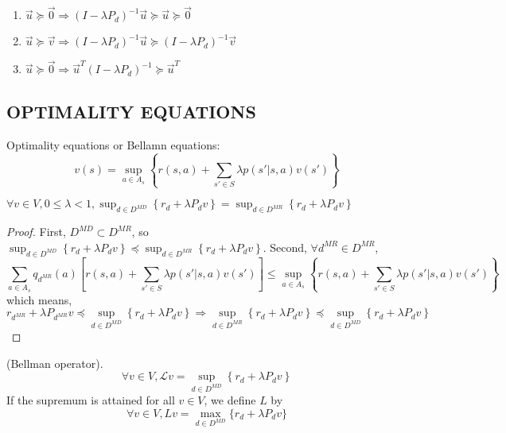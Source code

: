 \begin{lemma}
    \begin{enumerate}
        \item $ \vec u \succeq \vec 0 \Rightarrow {(I - \lambda P_d)}^{-1} \vec u \succeq \vec u \succeq \vec 0 $
        \item $ \vec u \succeq \vec v \Rightarrow {(I - \lambda P_d)}^{-1} \vec u \succeq {(I - \lambda P_d)}^{-1} \vec v $
        \item $ \vec u \succeq \vec 0 \Rightarrow \vec u^T {(I - \lambda P_d)}^{-1} \succeq \vec u^T $
    \end{enumerate}
\end{lemma}

\subsection{OPTIMALITY EQUATIONS}%
\label{sub:optimality_equations}

Optimality equations or Bellamn equations:
\[
    v(s) = \sup_{a \in A_s} \left\{ r(s, a) + \sum^{}_{s' \in S} \lambda p(s' | s, a) v(s') \right\}
\]

\begin{lemma}
    $ \forall v \in V, 0 \le \lambda < 1, \sup_{d \in D^{MD}} \left\{ r_d + \lambda P_d v \right\}
    = \sup_{d \in D^{MR}} \left\{ r_d + \lambda P_d v \right\}$ 
    \begin{proof}
        First, $ D^{MD} \subset D^{MR} $, so $ \sup_{d \in D^{MD}} \left\{ r_d + \lambda P_d v \right\}
    \preceq \sup_{d \in D^{MR}} \left\{ r_d + \lambda P_d v \right\} $.
    Second, $ \forall d^{MR} \in D^{MR} $,
    \[
        \sum^{}_{a \in A_s} q_{d^{MR}}(a) \left[ r(s, a) + \sum^{}_{s' \in S} \lambda p(s' | s, a) v(s') \right]
        \le \sup_{a \in A_s} \left\{ r(s, a) + \sum^{}_{s' \in S} \lambda p(s'|s, a) v(s') \right\}
    \]
    which means,
    \[
        r_{d^{MR}} +  \lambda P_{d^{MR}} v \preceq \sup_{d \in D^{MD}} \left\{ r_d + \lambda P_d v \right\}
        \Rightarrow \sup_{d \in D^{MR}}\left\{ r_d + \lambda P_d v \right\}
        \preceq \sup_{d \in D^{MD}}\left\{ r_d + \lambda P_d v \right\}
    \]
    
    \end{proof}
\end{lemma}

\begin{definition}
    (Bellman operator).
    \begin{equation}
        \forall v \in V, \mathcal{L} v = \sup_{d \in D^{MD}} \left\{ r_d + \lambda P_d v \right\}
    \end{equation}
    If the supremum is attained for all $ v \in V $, we define $ L $ by
    \begin{equation}
        \forall v \in V, Lv = \max_{d \in D^{MD}}\{r_d + \lambda P_d v\}
    \end{equation}
\end{definition}

